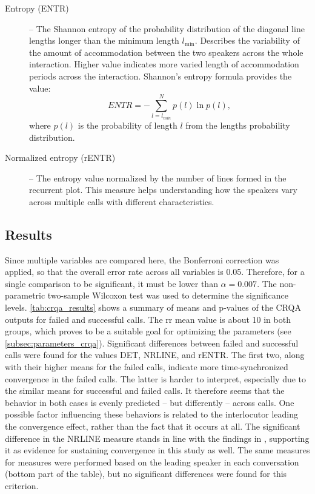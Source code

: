 \begin{description}
	\item[Entropy (ENTR)] -- The Shannon entropy of the probability distribution of the diagonal line lengths longer than the minimum length $l_{\min}$.
	Describes the variability of the amount of accommodation between the two speakers across the whole interaction.
	Higher value indicates more varied length of accommodation periods across the interaction.
	Shannon's entropy formula provides the value:
	\begin{equation}
		\label{eq:entr}
		ENTR = -\sum_{l=l_{min}}^{N} p(l) \ln p(l),
	\end{equation}
	where $p(l)$ is the probability of length $l$ from the lengths probability distribution.
	\item[Normalized entropy (rENTR)] -- The entropy value normalized by the number of lines formed in the recurrent plot.
	This measure helps understanding how the speakers vary across multiple calls with different characteristics.
\end{description}
%

\subsection{Results}
\label{subsec:results_hhi}

Since multiple variables are compared here, the Bonferroni correction \citep{Bonferroni1936teoria} was applied, so that the overall error rate across all variables is \num{0.05}.
Therefore, for a single comparison to be significant, it must be lower than $\alpha = 0.007$.
The non-parametric two-sample Wilcoxon test \citep{Wilcoxon1945individual} was used to determine the significance levels.
\cref{tab:crqa_results} shows a summary of means and p-values of the CRQA outputs for failed and successful calls.
The \ac{rr} mean value is about 10 in both groups, which proves to be a suitable goal for optimizing the parameters (see \cref{subsec:parameters_crqa}).
Significant differences between failed and successful calls were found for the values DET, NRLINE, and rENTR.
The first two, along with their higher means for the failed calls, indicate more time-synchronized convergence in the failed calls.
The latter is harder to interpret, especially due to the similar means for successful and failed calls.
It therefore seems that the behavior in both cases is evenly predicted -- but differently -- across calls.
One possible factor influencing these behaviors is related to the interlocutor leading the convergence effect, rather than the fact that it occurs at all.
The significant difference in the NRLINE measure stands in line with the findings in \citet{Borrie2019syncing}, supporting it as evidence for sustaining convergence in this study as well.
The same measures for measures were performed based on the leading speaker in each conversation (bottom part of the table), but no significant differences were found for this criterion.

